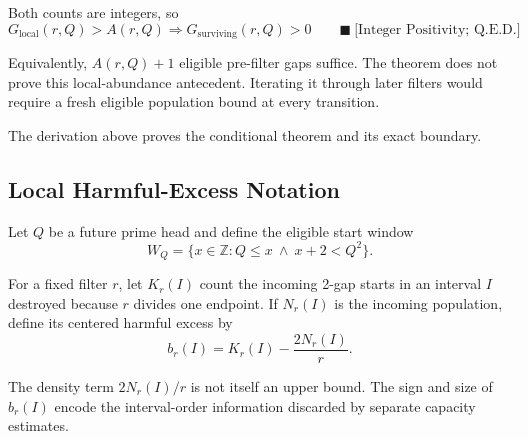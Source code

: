 Both counts are integers, so
\begin{equation*}
G_{\mathrm{local}}(r,Q)>A(r,Q)
\Longrightarrow
G_{\mathrm{surviving}}(r,Q)>0
\qquad\blacksquare\ \text{[Integer Positivity; Q.E.D.]}
\end{equation*}

Equivalently, $A(r,Q)+1$ eligible pre-filter gaps suffice. The theorem does
not prove this local-abundance antecedent. Iterating it through later filters
would require a fresh eligible population bound at every transition.

{\raggedright
The derivation above proves the conditional theorem and its exact boundary.
\par}

\subsection*{Local Harmful-Excess Notation}
\label{sec:local-harmful-excess-notation}

Let $Q$ be a future prime head and define the eligible start window
\begin{equation*}
W_Q=\{x\in\mathbb{Z}:Q\le x\ \land\ x+2\lt Q^2\}.
\end{equation*}

For a fixed filter $r$, let $K_r(I)$ count the incoming 2-gap starts in an
interval $I$ destroyed because $r$ divides one endpoint. If $N_r(I)$ is the
incoming population, define its centered harmful excess by
\begin{equation*}
b_r(I)=K_r(I)-\frac{2N_r(I)}r.
\end{equation*}

The density term $2N_r(I)/r$ is not itself an upper bound. The sign and size
of $b_r(I)$ encode the interval-order information discarded by separate
capacity estimates.
